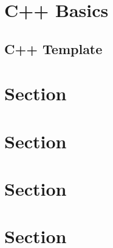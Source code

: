 \documentclass[12pt, letterpaper]{article}
\begin{document}


\tableofcontents

\pagebreak

\section{C++ Basics}

\subsection{C++ Template}

\kant[1]

\section{Section}

\section{Section}

\section{Section}

\section{Section}
\end{document}
